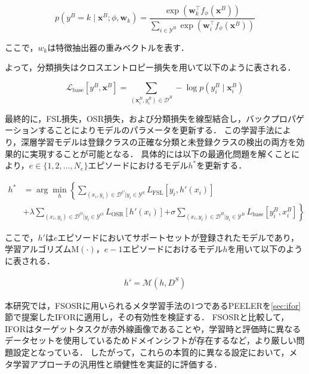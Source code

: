 \documentclass[a4paper,11pt,nomag]{jsreport}
\begin{document}
\begin{equation}
    p(y^B=k \mid \bm{x}^B;\phi,\mathbf{w}_k) 
        = \frac{\exp(\mathbf{w}_k^{\top} f_{\phi}(\bm{x}^B))}{\sum_{i \in \mathcal{Y}^B} \exp(\mathbf{w}_{i}^{\top} f_{\phi}(\bm{x}^B))}
\end{equation}

\noindent
ここで，$w_k$は特徴抽出器の重みベクトルを表す．

よって，分類損失はクロスエントロピー損失を用いて以下のように表される．

\begin{equation}
  \mathcal{L}_{\mathrm{base}} [y^B, \bm{x}^B] = \sum_{(\bm{x}^B_i,y^B_i) \in \mathcal{D}^B} - \log {p(y^B_i \mid \bm{x}^B_i)}
\end{equation}

最終的に，FSL損失，OSR損失，および分類損失を線型結合し，バックプロパゲーションすることによりモデルのパラメータを更新する．
この学習手法により，深層学習モデルは登録クラスの正確な分類と未登録クラスの検出の両方を効果的に実現することが可能となる．
具体的には以下の最適化問題を解くことにより，$e \in \{1, 2, \ldots, N_e\}$エピソードにおけるモデル$h^*$を更新する．

\begin{align}
  h^* & = \arg \min_h \left\{ \sum_{(x_i,y_i) \in \mathcal{D}^C|y_i \in \mathcal{Y}^S}{L_{\mathrm{FSL}}[y_i,h'(x_i)]} \right. \nonumber \\
      & + \lambda \sum_{(x_i,y_i) \in \mathcal{D}^O|y_i \in \mathcal{Y}^O}{L_{\mathrm{OSR}}[h'(x_i)]}
        \left. + \sigma \sum_{(x_i,y_i) \in \mathcal{D}^B|y_i \in \mathcal{Y}^B}{L_{\mathrm{base}}[y^B_i,x^B_i]} \right\}
\end{align}

\noindent
ここで，$h'$は$e$エピソードにおいてサポートセットが登録されたモデルであり，
学習アルゴリズム$\mathrm{M}(\cdot)$，$e-1$エピソードにおけるモデル$h$を用いて以下のように表される．

\begin{align}
  h' = \mathcal{M}(h, D^S)
\end{align}

本研究では，FSOSRに用いられるメタ学習手法の1つであるPEELERを\ref{sec:ifor}節で提案したIFORに適用し，その有効性を検証する．
FSOSRと比較して，IFORはターゲットタスクが赤外線画像であることや，学習時と評価時に異なるデータセットを使用しているためドメインシフトが存在するなど，より厳しい問題設定となっている．
したがって，これらの本質的に異なる設定において，メタ学習アプローチの汎用性と頑健性を実証的に評価する．
\end{document}
